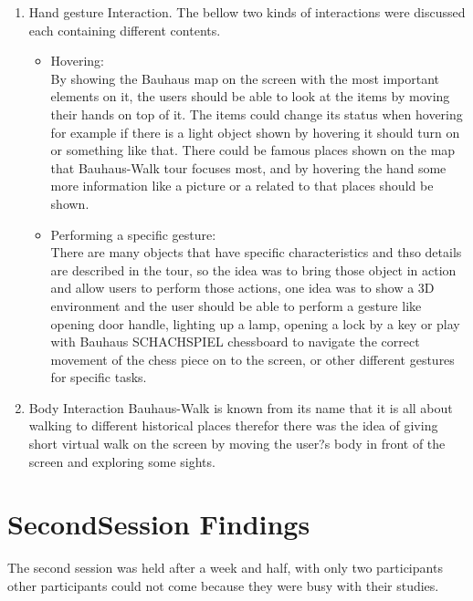\begin {enumerate}
\item	Hand gesture Interaction.
The bellow two kinds of interactions were discussed each containing different contents. 

\begin {itemize}
\item	Hovering: \\
By showing the Bauhaus map on the screen with the most important elements on it, the users should be able to look at the items by moving their hands on top of it. The items could change its status when hovering for example if there is a light object shown by hovering it should turn on or something like that.
There could be famous places shown on the map that Bauhaus-Walk tour focuses most, and by hovering the hand some more information like a picture or a related to that places should be shown.

\item	Performing a specific gesture:\\
There are many objects that have specific characteristics and thso details are described in the tour, so the idea was to bring those object in action and allow users to perform those actions, one idea was to show a 3D environment and the user should be able to perform a gesture like opening door handle, lighting up a lamp, opening a lock by a key or play with Bauhaus SCHACHSPIEL chessboard to navigate the correct movement of the chess piece on to the screen, or other different gestures for specific tasks.

\end{itemize}

\item	Body Interaction
Bauhaus-Walk is known from its name that it is all about walking to different historical places therefor there was the idea of giving short virtual walk on the screen by moving the user?s body in front of the screen and exploring some sights.

\end{enumerate}





\section{SecondSession Findings}
The second session was held after a week and half, with only two participants other participants could not come because they were busy with their studies. 

